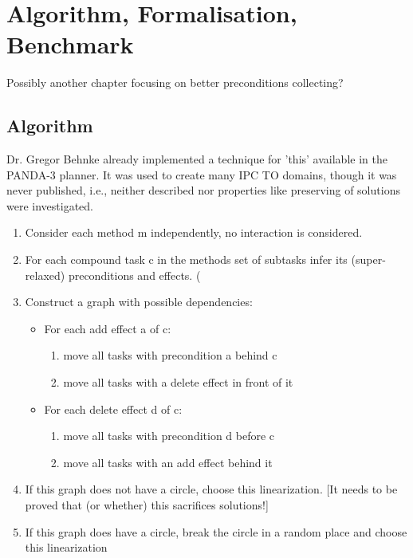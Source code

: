 \chapter{Algorithm, Formalisation, Benchmark}\label{chap:content}
\large{Possibly another chapter focusing on better preconditions collecting?}


\section{Algorithm}
Dr. Gregor Behnke already implemented a technique for 'this' available in the PANDA-3 planner. It was used to create many IPC TO domains, though it was never published, i.e., neither described nor properties like preserving of solutions were investigated.

\begin{enumerate}
	\item Consider each method m independently, no interaction is considered.
	\item For each compound task c in the methods set of subtasks infer its (super-relaxed) preconditions and effects. (
	\item Construct a graph with possible dependencies:  
	\begin{itemize}
		\item For each add effect a of c:
			\begin{enumerate} 
				\item move all tasks with precondition a behind c 
				\item move all tasks with a delete effect in front of it
			\end{enumerate}
		\item For each delete effect d of c:
			\begin{enumerate} 
				\item move all tasks with precondition d before c %
				\item move all tasks with an add effect behind it
			\end{enumerate}
	\end{itemize}
    \item If this graph does not have a circle, choose this linearization.  [It needs to be proved that (or whether) this sacrifices solutions!]
    \item If this graph does have a circle, break the circle in a random place and choose this linearization
\end{enumerate}



